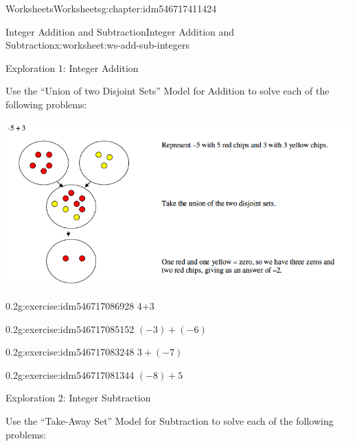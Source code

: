 \documentclass[twoside,11pt,]{book}
\begin{document}
\begin{chapterptx}{Worksheets}{}{Worksheets}{}{}{g:chapter:idm546717411424}
%
\begin{worksheet-section-numberless}{Integer Addition and Subtraction}{}{Integer Addition and Subtraction}{}{}{x:worksheet:ws-add-sub-integers}
\begin{introduction}{}%
Exploration 1: Integer Addition%
\par
Use the ``Union of two Disjoint Sets'' Model for Addition to solve each of the following problems: \begin{sidebyside}{1}{0}{0}{0}%
\begin{sbspanel}{1}%
\includegraphics[width=1\linewidth]{images/integer-add-model.png}
\end{sbspanel}%
\end{sidebyside}%
%
\end{introduction}%
\begin{divisionexercise}{1}{}{0.2}{g:exercise:idm546717086928}%
4+3%
\end{divisionexercise}%
\clearpage
\begin{divisionexercise}{2}{}{0.2}{g:exercise:idm546717085152}%
\((-3)+(-6) \)%
\end{divisionexercise}%
\begin{divisionexercise}{3}{}{0.2}{g:exercise:idm546717083248}%
\(3+(-7) \)%
\end{divisionexercise}%
\begin{divisionexercise}{4}{}{0.2}{g:exercise:idm546717081344}%
\((-8)+ 5 \)%
\end{divisionexercise}%
\clearpage
\begin{introduction}{}%
Exploration 2: Integer Subtraction%
\par
Use the ``Take-Away Set'' Model for Subtraction to solve each of the following problems: \begin{sidebyside}{1}{0}{0}{0}%
\begin{sbspanel}{1}%

\end{sbspanel}
\end{sidebyside}
\end{introduction}
\end{worksheet-section-numberless}
\end{chapterptx}
\end{document}
